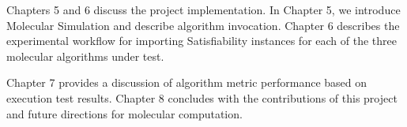 Chapters 5 and 6 discuss the project implementation.  In Chapter 5, we introduce Molecular Simulation and describe algorithm invocation.  Chapter 6 describes the experimental workflow for importing {\sc Satisfiability} instances for each of the three molecular algorithms under test.

Chapter 7 provides a discussion of algorithm metric performance based on execution test results.  Chapter 8 concludes with the contributions of this project and future directions for molecular computation.